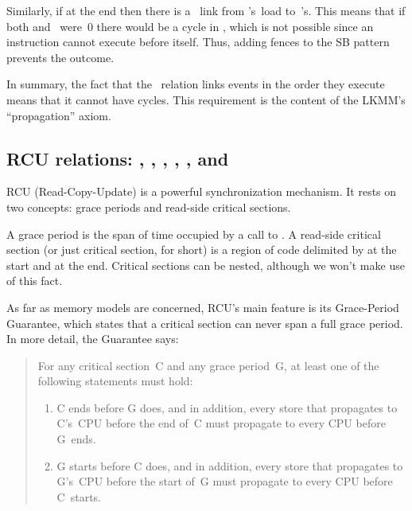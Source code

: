 Similarly, if  at the end then there is a ~link from
's~load to~'s.
This means that if both  and~ were~0 there would be a
cycle in , which is not possible since an instruction cannot execute
before itself.
Thus, adding  fences to the SB pattern prevents
the  outcome.

In summary, the fact that the ~relation links events in the order
they execute means that it cannot have cycles.
This requirement is the content of the LKMM's ``propagation'' axiom.


\subsection{RCU relations: , , , , , and }
\label{sec:docs:explanation:RCU Relations: rcu-link, rcu-gp, rcu-rscsi, rcu-order, rcu-fence, and rb}

RCU (Read-Copy-Update) is a powerful synchronization mechanism.
It rests on two concepts: grace periods and read-side critical sections.

A grace period is the span of time occupied by a call to
.
A read-side critical section (or just critical section, for short) is
a region of code delimited by  at the start and
 at the end.
Critical sections can be nested, although we won't make use of this fact.

As far as memory models are concerned, RCU's main feature is its
Grace-Period Guarantee, which states that a critical section can never
span a full grace period.
In more detail, the Guarantee says:

\begin{quote}
  For any critical section~C and any grace period~G, at least one of
  the following statements must hold:

  \begin{enumerate}
  \item	C ends before G does, and in addition, every store that
	propagates to C's~CPU before the end of~C must propagate to
	every CPU before G~ends.

  \item	G starts before C does, and in addition, every store that
	propagates to G's~CPU before the start of~G must propagate
	to every CPU before C~starts.
  \end{enumerate}
\end{quote}

